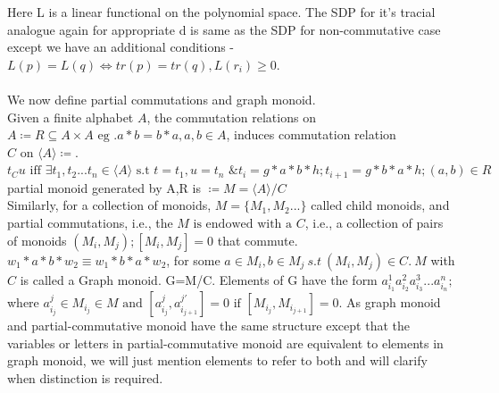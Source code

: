 Here L is a linear functional on the polynomial space.
The SDP for it's tracial analogue again for appropriate d is same as the SDP for non-commutative case except we have an additional conditions - $L(p)=L(q) \iff tr(p)=tr(q), L(r_i)\geq 0$.\\~\\
We now define partial commutations and graph monoid.\\
Given a finite alphabet $A$, the commutation relations on  $A \coloneq R \subseteq A \times A \mbox{ eg }. a*b=b*a,a,b \in A$, induces commutation relation $C \mbox{ on } \langle A \rangle \coloneq$.  $t_Cu \mbox{ iff } \exists t_1,t_2...t_n \in \langle A \rangle \mbox{ s.t } t=t_1,u=t_n \mbox{ \& } t_{i}=g*a*b*h ; t_{i+1}=g*b*a*h; (a,b) \in R$ \\
partial monoid generated by A,R is $\coloneq M=\langle A\rangle /C$\\
Similarly, for a collection of monoids, $M=\{M_1,M_2...\}$ called child monoids, and partial commutations, i.e., the $M \mbox{ is endowed with a } C$, i.e., a collection of pairs of monoids $(M_i, M_j); [M_i, M_j]=0$ that commute.  $w_1*a*b*w_2\equiv w_1*b*a*w_2$, for some $a \in M_i,b \in M_j \: s.t\:  (M_i,M_j) \in C. \: M$ with $ C$ is called a Graph monoid. G=M/C. Elements of G have the form $a^1_{i_1}a^2_{i_2}a^3_{i_3}...a^n_{i_n};$ where $a^j_{i_j} \in M_{i_j} \in M \mbox{ and } [a^j_{i_j},a^{j'}_{i_{j+1}}]=0\mbox{ if }[M_{i_{j}},M_{i_{j+1}}]=0. $
As graph monoid and partial-commutative monoid have the same structure except that the variables or letters in partial-commutative monoid are equivalent to elements in graph monoid, we will just mention elements to refer to both and will clarify when distinction is required.
